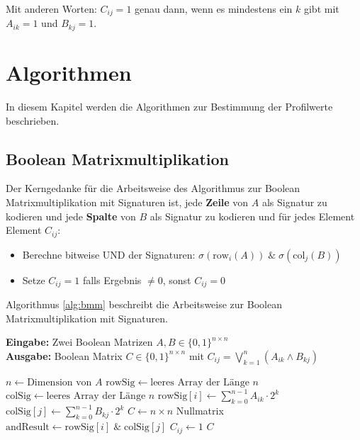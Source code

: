 ﻿\documentclass[a4paper,12pt]{article}
\theoremstyle{definition}
\begin{document}
	Mit anderen Worten: $C_{ij} = 1$ genau dann, wenn es mindestens ein $k$ gibt mit $A_{ik} = 1$ und $B_{kj} = 1$.
	
	\section{Algorithmen}
	
	In diesem Kapitel werden die Algorithmen zur Bestimmung der Profilwerte beschrieben.
	
	\subsection{Boolean Matrixmultiplikation}
	
	Der Kerngedanke für die Arbeitsweise des Algorithmus zur Boolean Matrixmultiplikation mit Signaturen ist, jede \textbf{Zeile} von $A$ als Signatur zu kodieren und jede \textbf{Spalte} von $B$ als Signatur zu kodieren und für jedes Element Element $C_{ij}$:
	\begin{itemize}
		\item[-] Berechne bitweise UND der Signaturen: $\sigma(\text{row}_i(A)) \; \& \; \sigma(\text{col}_j(B))$
		\item[-] Setze $C_{ij} = 1$ falls Ergebnis $\neq 0$, sonst $C_{ij} = 0$
	\end{itemize}
	
	Algorithmus \ref{alg:bmm} beschreibt die Arbeitsweise zur Boolean Matrixmultiplikation mit Signaturen.
	
	\begin{algorithm}[htb]
		\caption{Boolean Matrixmultiplikation mit Signaturen}
		\label{alg:bmm}
		\textbf{Eingabe:} Zwei Boolean Matrizen $A, B \in \{0,1\}^{n \times n}$ \\
		\textbf{Ausgabe:} Boolean Matrix $C \in \{0,1\}^{n \times n}$ mit $C_{ij} = \bigvee_{k=1}^{n} (A_{ik} \wedge B_{kj})$
		\begin{algorithmic}[1]
			\State $n \gets \text{Dimension von } A$
			\State $\text{rowSig} \gets \text{leeres Array der Länge } n$
			\State $\text{colSig} \gets \text{leeres Array der Länge } n$
			\State $\text{rowSig}[i] \gets \sum_{k=0}^{n-1} A_{ik} \cdot 2^k$ 
			\EndFor
			\State $\text{colSig}[j] \gets \sum_{k=0}^{n-1} B_{kj} \cdot 2^k$ 
			\EndFor
			\State $C \gets n \times n$ Nullmatrix
			\State $\text{andResult} \gets \text{rowSig}[i] \; \& \; \text{colSig}[j]$ 
			\State $C_{ij} \gets 1$
			\EndIf
			\EndFor
			\EndFor    
			\State \Return $C$
		\end{algorithmic}
	\end{algorithm}
	
\end{document}
